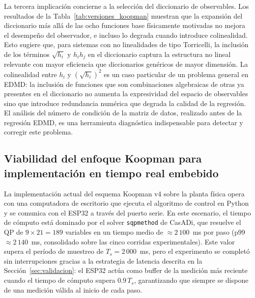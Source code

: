 \documentclass[12pt,letterpaper]{article}
\begin{document}
La tercera implicación concierne a la selección del diccionario 
de observables. Los resultados de la 
Tabla~\ref{tab:versiones_koopman} muestran que la expansión del 
diccionario más allá de las ocho funciones base físicamente 
motivadas no mejora el desempeño del observador, e incluso lo 
degrada cuando introduce colinealidad. Esto sugiere que, para 
sistemas con no linealidades de tipo Torricelli, la inclusión de 
los términos $\sqrt{h_i}$ y $h_i h_j$ en el diccionario captura 
la estructura no lineal relevante con mayor eficiencia que 
diccionarios genéricos de mayor dimensión. La colinealidad entre 
$h_i$ y $(\sqrt{h_i})^2$ es un caso particular de un problema 
general en EDMD: la inclusión de funciones que son combinaciones 
algebraicas de otras ya presentes en el diccionario no aumenta 
la expresividad del espacio de observables sino que introduce 
redundancia numérica que degrada la calidad de la regresión. 
El análisis del número de condición de la matriz de datos, 
realizado antes de la regresión EDMD, es una herramienta 
diagnóstica indispensable para detectar y corregir este problema.

\subsection{Viabilidad del enfoque Koopman para implementación 
en tiempo real embebido}
\label{sec:discusion_embebido}

La implementación actual del esquema Koopman v4 sobre la planta 
física opera con una computadora de escritorio que ejecuta el 
algoritmo de control en Python y se comunica con el ESP32 a través 
del puerto serie. En este escenario, el tiempo de cómputo está 
dominado por el solver \texttt{sqpmethod} de CasADi, que resuelve 
el QP de $9 \times 21 = 189$ variables en un tiempo medio de 
$\approx 2\,100$~ms por paso (p99 $\approx 2\,140$~ms, consolidado 
sobre las cinco corridas experimentales). Este valor supera el 
período de muestreo de $T_s = 2\,000$~ms, pero el experimento se 
completó sin interrupciones gracias a la estrategia de latencia 
descrita en la Sección~\ref{sec:validacion}: el ESP32 actúa como 
buffer de la medición más reciente cuando el tiempo de cómputo 
supera $0.9\,T_s$, garantizando que siempre se dispone de una 
medición válida al inicio de cada paso.
\end{document}
